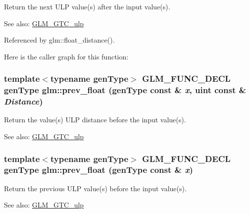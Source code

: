 Return the next ULP value(s) after the input value(s). \begin{Desc}
\item[See also:]\hyperlink{group__gtc__ulp}{GLM\_\-GTC\_\-ulp} \end{Desc}


Referenced by glm::float\_\-distance().

Here is the caller graph for this function:\hypertarget{group__gtc__ulp_ge55d449df292398361ccecad1cc5ead4}{
\subsubsection[prev\_\-float]{\setlength{\rightskip}{0pt plus 5cm}template$<$typename genType$>$ GLM\_\-FUNC\_\-DECL genType glm::prev\_\-float (genType const \& {\em x}, \/  uint const \& {\em Distance})}}
\label{group__gtc__ulp_ge55d449df292398361ccecad1cc5ead4}


Return the value(s) ULP distance before the input value(s). \begin{Desc}
\item[See also:]\hyperlink{group__gtc__ulp}{GLM\_\-GTC\_\-ulp} \end{Desc}
\hypertarget{group__gtc__ulp_gf1c61fb2a0092a4222dae424dd96aeb0}{
\subsubsection[prev\_\-float]{\setlength{\rightskip}{0pt plus 5cm}template$<$typename genType$>$ GLM\_\-FUNC\_\-DECL genType glm::prev\_\-float (genType const \& {\em x})}}
\label{group__gtc__ulp_gf1c61fb2a0092a4222dae424dd96aeb0}


Return the previous ULP value(s) before the input value(s). \begin{Desc}
\item[See also:]\hyperlink{group__gtc__ulp}{GLM\_\-GTC\_\-ulp} \end{Desc}

